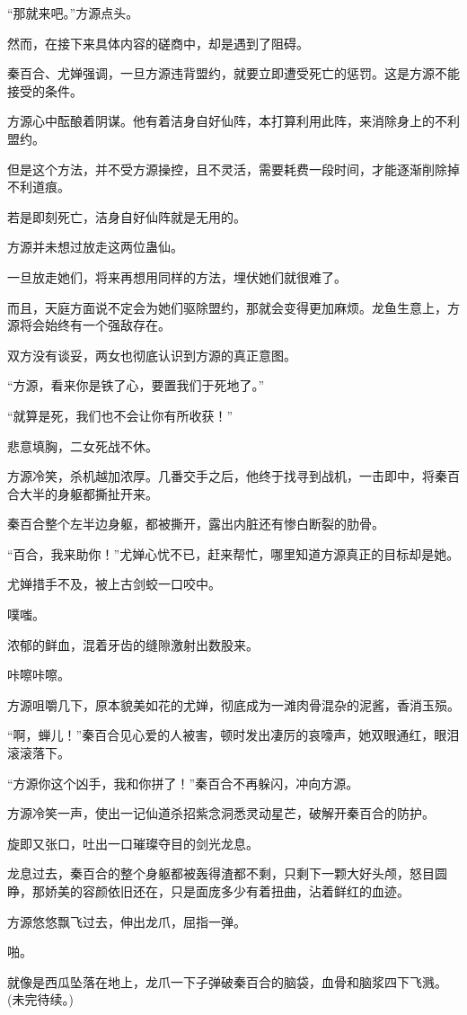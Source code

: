 \begin{this_body}
“那就来吧。”方源点头。

然而，在接下来具体内容的磋商中，却是遇到了阻碍。

秦百合、尤婵强调，一旦方源违背盟约，就要立即遭受死亡的惩罚。这是方源不能接受的条件。

方源心中酝酿着阴谋。他有着洁身自好仙阵，本打算利用此阵，来消除身上的不利盟约。

但是这个方法，并不受方源操控，且不灵活，需要耗费一段时间，才能逐渐削除掉不利道痕。

若是即刻死亡，洁身自好仙阵就是无用的。

方源并未想过放走这两位蛊仙。

一旦放走她们，将来再想用同样的方法，埋伏她们就很难了。

而且，天庭方面说不定会为她们驱除盟约，那就会变得更加麻烦。龙鱼生意上，方源将会始终有一个强敌存在。

双方没有谈妥，两女也彻底认识到方源的真正意图。

“方源，看来你是铁了心，要置我们于死地了。”

“就算是死，我们也不会让你有所收获！”

悲意填胸，二女死战不休。

方源冷笑，杀机越加浓厚。几番交手之后，他终于找寻到战机，一击即中，将秦百合大半的身躯都撕扯开来。

秦百合整个左半边身躯，都被撕开，露出内脏还有惨白断裂的肋骨。

“百合，我来助你！”尤婵心忧不已，赶来帮忙，哪里知道方源真正的目标却是她。

尤婵措手不及，被上古剑蛟一口咬中。

噗嗤。

浓郁的鲜血，混着牙齿的缝隙激射出数股来。

咔嚓咔嚓。

方源咀嚼几下，原本貌美如花的尤婵，彻底成为一滩肉骨混杂的泥酱，香消玉殒。

“啊，蝉儿！”秦百合见心爱的人被害，顿时发出凄厉的哀嚎声，她双眼通红，眼泪滚滚落下。

“方源你这个凶手，我和你拼了！”秦百合不再躲闪，冲向方源。

方源冷笑一声，使出一记仙道杀招紫念洞悉灵动星芒，破解开秦百合的防护。

旋即又张口，吐出一口璀璨夺目的剑光龙息。

龙息过去，秦百合的整个身躯都被轰得渣都不剩，只剩下一颗大好头颅，怒目圆睁，那娇美的容颜依旧还在，只是面庞多少有着扭曲，沾着鲜红的血迹。

方源悠悠飘飞过去，伸出龙爪，屈指一弹。

啪。

就像是西瓜坠落在地上，龙爪一下子弹破秦百合的脑袋，血骨和脑浆四下飞溅。(未完待续。)

\end{this_body}

